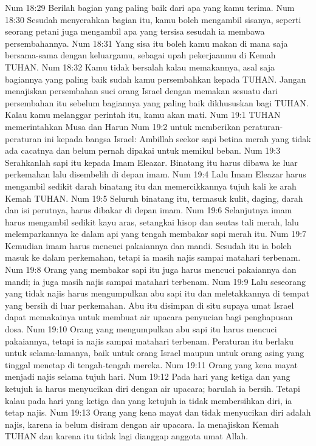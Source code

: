 Num 18:29  Berilah bagian yang paling baik dari apa yang kamu terima.
Num 18:30  Sesudah menyerahkan bagian itu, kamu boleh mengambil sisanya, seperti seorang petani juga mengambil apa yang tersisa sesudah ia membawa persembahannya.
Num 18:31  Yang sisa itu boleh kamu makan di mana saja bersama-sama dengan keluargamu, sebagai upah pekerjaanmu di Kemah TUHAN.
Num 18:32  Kamu tidak bersalah kalau memakannya, asal saja bagiannya yang paling baik sudah kamu persembahkan kepada TUHAN. Jangan menajiskan persembahan suci orang Israel dengan memakan sesuatu dari persembahan itu sebelum bagiannya yang paling baik dikhususkan bagi TUHAN. Kalau kamu melanggar perintah itu, kamu akan mati.
Num 19:1  TUHAN memerintahkan Musa dan Harun
Num 19:2  untuk memberikan peraturan-peraturan ini kepada bangsa Israel: Ambillah seekor sapi betina merah yang tidak ada cacatnya dan belum pernah dipakai untuk memikul beban.
Num 19:3  Serahkanlah sapi itu kepada Imam Eleazar. Binatang itu harus dibawa ke luar perkemahan lalu disembelih di depan imam.
Num 19:4  Lalu Imam Eleazar harus mengambil sedikit darah binatang itu dan memercikkannya tujuh kali ke arah Kemah TUHAN.
Num 19:5  Seluruh binatang itu, termasuk kulit, daging, darah dan isi perutnya, harus dibakar di depan imam.
Num 19:6  Selanjutnya imam harus mengambil sedikit kayu aras, setangkai hisop dan seutas tali merah, lalu melemparkannya ke dalam api yang tengah membakar sapi merah itu.
Num 19:7  Kemudian imam harus mencuci pakaiannya dan mandi. Sesudah itu ia boleh masuk ke dalam perkemahan, tetapi ia masih najis sampai matahari terbenam.
Num 19:8  Orang yang membakar sapi itu juga harus mencuci pakaiannya dan mandi; ia juga masih najis sampai matahari terbenam.
Num 19:9  Lalu seseorang yang tidak najis harus mengumpulkan abu sapi itu dan meletakkannya di tempat yang bersih di luar perkemahan. Abu itu disimpan di situ supaya umat Israel dapat memakainya untuk membuat air upacara penyucian bagi penghapusan dosa.
Num 19:10  Orang yang mengumpulkan abu sapi itu harus mencuci pakaiannya, tetapi ia najis sampai matahari terbenam. Peraturan itu berlaku untuk selama-lamanya, baik untuk orang Israel maupun untuk orang asing yang tinggal menetap di tengah-tengah mereka.
Num 19:11  Orang yang kena mayat menjadi najis selama tujuh hari.
Num 19:12  Pada hari yang ketiga dan yang ketujuh ia harus menyucikan diri dengan air upacara; barulah ia bersih. Tetapi kalau pada hari yang ketiga dan yang ketujuh ia tidak membersihkan diri, ia tetap najis.
Num 19:13  Orang yang kena mayat dan tidak menyucikan diri adalah najis, karena ia belum disiram dengan air upacara. Ia menajiskan Kemah TUHAN dan karena itu tidak lagi dianggap anggota umat Allah.
